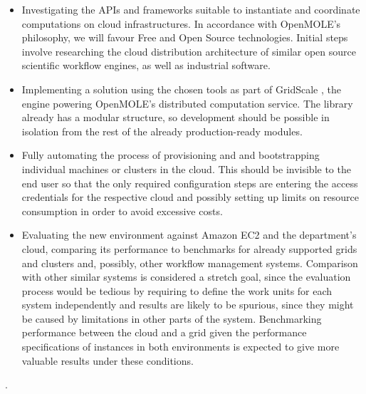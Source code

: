 \begin{itemize}
	\item Investigating the APIs and frameworks suitable to instantiate and coordinate computations on cloud infrastructures. In accordance with OpenMOLE's philosophy, we will favour Free and Open Source technologies. Initial steps involve researching the cloud distribution architecture of similar open source scientific workflow engines, as well as industrial software.
	\item Implementing a solution using the chosen tools as part of GridScale \cite{Passerat2016}, the engine powering OpenMOLE's distributed computation service. The library already has a modular structure, so development should be possible in isolation from the rest of the already production-ready modules.
	\item Fully automating the process of provisioning and and bootstrapping individual machines or clusters in the cloud. This should be invisible to the end user so that the only required configuration steps are entering the access credentials for the respective cloud and possibly setting up limits on resource consumption in order to avoid excessive costs.
	\item Evaluating the new environment against Amazon EC2 and the department's cloud, comparing its performance to benchmarks for already supported grids and clusters and, possibly, other workflow management systems. Comparison with other similar systems is considered a stretch goal, since the evaluation process would be tedious by requiring to define the work units for each system independently and results are likely to be spurious, since they might be caused by limitations in other parts of the system. Benchmarking performance between the cloud and a grid given the performance specifications of instances in both environments is expected to give more valuable results under these conditions.
\end{itemize}


.